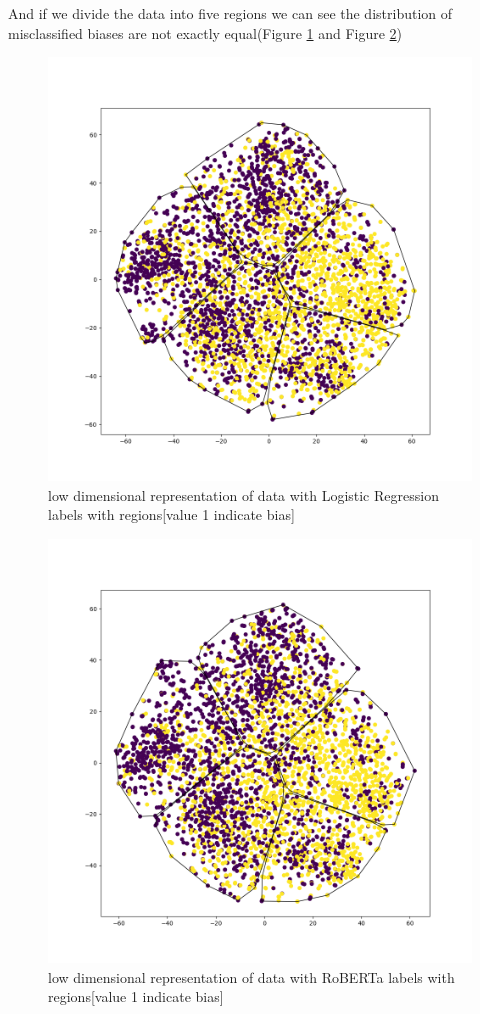 \documentclass[11pt,a4paper]{article}
\begin{document}
And if we divide the data into five regions we can see the distribution of misclassified biases are not exactly equal(Figure \ref{fig:t-sne_logic_re} and Figure \ref{fig:t-sne_RoBERTa_re})
\begin{figure}[H]
    \centering
    \includegraphics[width=0.9\linewidth]{Labels_Logistic_tsne_plot_re.png}
    \caption{low dimensional representation of data with Logistic Regression labels with regions[value 1 indicate bias]}
    \label{fig:t-sne_logic_re}
\end{figure}
\begin{figure}[H]
    \centering
    \includegraphics[width=0.9\linewidth]{Labels_RoBERTa_tsne_plot_re.png}
    \caption{low dimensional representation of data with RoBERTa labels with regions[value 1 indicate bias]}
    \label{fig:t-sne_RoBERTa_re}
\end{figure}
\end{document}
